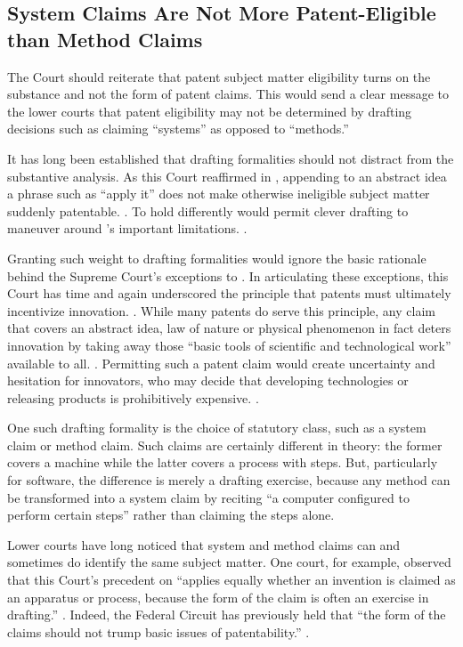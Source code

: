 \documentclass{scotus}
\begin{document}
%
%
\subsection{System Claims Are Not More Patent-Eligible than Method Claims}

The Court should reiterate that patent subject matter eligibility turns on the
substance and not the form of patent claims.  This would send a clear message to
the lower courts that patent eligibility may not be determined by drafting
decisions such as claiming “systems” as opposed to “methods.” 

It has long been established that drafting formalities should not distract from
the substantive  analysis.  As this Court reaffirmed in
, appending to an abstract idea
a phrase such as “apply it” does
not make otherwise ineligible subject matter suddenly patentable. .  To hold differently would permit clever drafting to maneuver around
's important limitations. .

Granting such weight to drafting formalities would ignore the basic rationale
behind the Supreme Court’s exceptions to .  In articulating these
exceptions, this Court has time and again underscored the principle that patents
must ultimately incentivize innovation. . While many patents do serve this principle, any claim that
covers an abstract idea, law of nature or physical phenomenon in fact deters
innovation by taking away those “basic tools of scientific and technological
work”  available to all. . Permitting such a patent claim
would create uncertainty and hesitation for innovators, who may decide
that developing technologies or releasing products is prohibitively
expensive. .

One such drafting formality is the choice of statutory class, such as a system
claim or method claim.
Such claims are certainly different in theory: the former covers a
machine while the latter covers a process with steps. But, particularly for
software, the difference is merely a drafting exercise, because any method can
be transformed into a system claim by reciting “a computer configured to perform
certain steps” rather than claiming the steps alone. 

Lower courts have long noticed that system and method claims can and sometimes
do identify the same subject matter.  One court, for example, observed
that this Court's precedent on  ``applies equally whether an
invention is claimed as an apparatus or process, because the form of the claim
is often an exercise in drafting.'' . Indeed, the Federal Circuit has previously held
that ``the form of the claims should not trump basic issues of patentability.''
.
\end{document}
